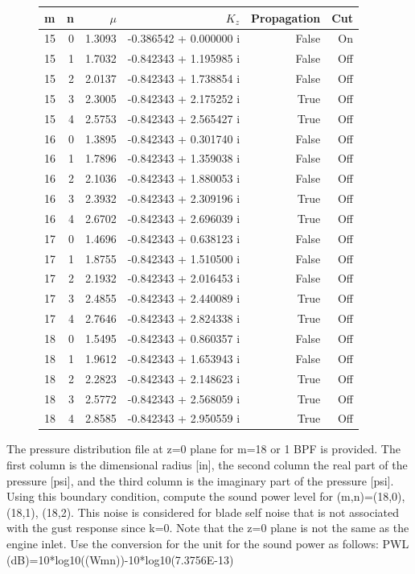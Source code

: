 \documentclass[onecolumn,10pt]{jhwhw}
\begin{document}
\begin{figure}[h]
\centering
\begin{tabular}{lr | rr | r r}
\toprule
     m &    n &      $\mu$ &       $K_z$          &  Propagation & Cut\\
\midrule
15 &  0 &  1.3093 & -0.386542 +  0.000000 i &       False  & On  \\
15 &  1 &  1.7032 & -0.842343 +  1.195985 i &       False  & Off \\
15 &  2 &  2.0137 & -0.842343 +  1.738854 i &       False  & Off \\
15 &  3 &  2.3005 & -0.842343 +  2.175252 i &        True  & Off \\
15 &  4 &  2.5753 & -0.842343 +  2.565427 i &        True  & Off \\
16 &  0 &  1.3895 & -0.842343 +  0.301740 i &       False  & Off \\
16 &  1 &  1.7896 & -0.842343 +  1.359038 i &       False  & Off \\
16 &  2 &  2.1036 & -0.842343 +  1.880053 i &       False  & Off \\
16 &  3 &  2.3932 & -0.842343 +  2.309196 i &        True  & Off \\
16 &  4 &  2.6702 & -0.842343 +  2.696039 i &        True  & Off \\
17 &  0 &  1.4696 & -0.842343 +  0.638123 i &       False  & Off \\
17 &  1 &  1.8755 & -0.842343 +  1.510500 i &       False  & Off \\
17 &  2 &  2.1932 & -0.842343 +  2.016453 i &       False  & Off \\
17 &  3 &  2.4855 & -0.842343 +  2.440089 i &        True  & Off \\
17 &  4 &  2.7646 & -0.842343 +  2.824338 i &        True  & Off \\
18 &  0 &  1.5495 & -0.842343 +  0.860357 i &       False  & Off \\
18 &  1 &  1.9612 & -0.842343 +  1.653943 i &       False  & Off \\
18 &  2 &  2.2823 & -0.842343 +  2.148623 i &        True  & Off \\
18 &  3 &  2.5772 & -0.842343 +  2.568059 i &        True  & Off \\
18 &  4 &  2.8585 & -0.842343 +  2.950559 i &        True  & Off \\
\bottomrule
\end{tabular}
\end{figure}

\clearpage
\problem{[30 points]}
The pressure distribution file at z=0 plane for m=18 or 1 BPF is provided. The first column is the dimensional radius [in], the second column the real part of the pressure [psi], and the third column is the imaginary part of the pressure [psi]. Using this boundary condition, compute the sound power level for (m,n)=(18,0), (18,1), (18,2). This noise is considered for blade self noise that is not associated with the gust response since k=0. Note that the z=0 plane is not the same as the engine inlet. Use the conversion for the unit for the sound power as follows: PWL (dB)=10*log10((Wmn))-10*log10(7.3756E-13)
\end{document}
